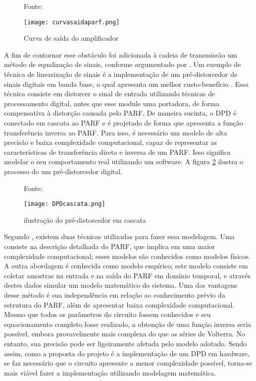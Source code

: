 \begin{figure}[ht!]
    \centering
    \captionsetup{justification=centering}
    \caption*{Fonte: \cite{Chavez2018}}
    \texttt{[image: curvasaidaparf.png]}
    \caption{Curva de saída do amplificador}
    \label{fig:saidaparf}
\end{figure}

A fim de contornar esse obstáculo foi adicionada à cadeia de transmissão um método de equalização de sinais, conforme argumentado por \cite{Kenington2000}. Um exemplo de técnica de linearização de sinais é a implementação de um pré-distorcedor de sinais digitais em banda base, o qual apresenta um melhor custo-benefício \cite{Kenington2000}. Essa técnica consiste em distorcer o sinal de entrada utilizando técnicas de processamento digital, antes que esse module uma portadora, de forma compensativa à distorção causada pelo PARF. De maneira sucinta, o DPD é conectado em cascata ao PARF e é projetado de forma que apresenta a função transferência inversa ao PARF. Para isso, é necessário um modelo de alta precisão e baixa complexidade computacional, capaz de representar as características de transferência direta e inversa de um PARF. Isso significa modelar o seu comportamento real utilizando um software.  A figura \ref{fig:cascatadpd} ilustra o processo do um pré-distorcedor digital.

\begin{figure}[h!]
    \centering
    \captionsetup{justification=centering}
    \caption*{Fonte: \cite{Chavez2018}}
    \texttt{[image: DPDcascata.png]}
    \caption{ilustração do pré-distorcedor em cascata}
    \label{fig:cascatadpd}
\end{figure}

Segundo \cite{John2016}, existem duas técnicas utilizadas para fazer essa modelagem. Uma consiste na descrição detalhada do PARF, que implica em uma maior complexidade computacional; esses modelos são conhecidos como modelos físicos. A outra abordagem é conhecida como modelo empírico; este modelo consiste em coletar amostras na entrada e na saída do PARF em domínio temporal, e através destes dados simular um modelo matemático do sistema. 
Uma das vantagens desse método é sua independência em relação ao conhecimento prévio da estrutura do PARF, além de apresentar baixa complexidade computacional. Mesmo que todos os parâmetros do circuito fossem conhecidos e seu equacionamento completo fosse realizado, a obtenção de uma função inversa seria possível, embora provavelmente mais complexa do que as séries de Volterra. No entanto, sua precisão pode ser ligeiramente afetada pelo modelo adotado. 
Sendo assim, como a proposta do projeto é a implementação de um DPD em hardware, se faz necessário que o circuito apresente a menor complexidade possível,  torna-se mais viável fazer a implementação utilizando modelagem matemática. 

